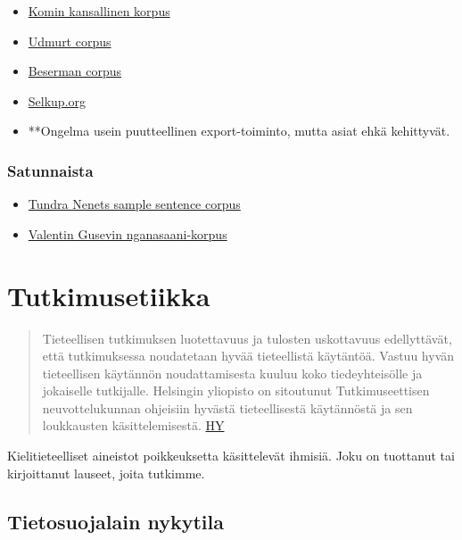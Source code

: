 \documentclass[]{book}
\providecommand{\tightlist}{%
  \setlength{\itemsep}{0pt}\setlength{\parskip}{0pt}}
\begin{document}
\begin{itemize}
\item
  \href{http://komicorpora.ru}{Komin kansallinen korpus}
\item
  \href{http://web-corpora.net/UdmurtCorpus/search/}{Udmurt corpus}
\item
  \href{http://beserman.ru/corpus/search/}{Beserman corpus}
\item
  \href{http://selkup.org/}{Selkup.org}
\item
  **Ongelma usein puutteellinen export-toiminto, mutta asiat ehkä
  kehittyvät.
\end{itemize}

\hypertarget{satunnaista}{%
\subsection{Satunnaista}\label{satunnaista}}

\begin{itemize}
\tightlist
\item
  \href{http://www.helsinki.fi/~tasalmin/tn_corpus.html}{Tundra Nenets
  sample sentence corpus}
\item
  \href{http://www.iling-ran.ru/gusev/Nganasan/}{Valentin Gusevin
  nganasaani-korpus}
\end{itemize}

\hypertarget{tutkimusetiikka-1}{%
\chapter{Tutkimusetiikka}\label{tutkimusetiikka-1}}

\begin{quote}
Tieteellisen tutkimuksen luotettavuus ja tulosten uskottavuus
edellyttävät, että tutkimuksessa noudatetaan hyvää tieteellistä
käytäntöä. Vastuu hyvän tieteellisen käytännön noudattamisesta kuuluu
koko tiedeyhteisölle ja jokaiselle tutkijalle. Helsingin yliopisto on
sitoutunut Tutkimuseettisen neuvottelukunnan ohjeisiin hyvästä
tieteellisestä käytännöstä ja sen loukkausten käsittelemisestä.
\href{https://www.helsinki.fi/fi/tutkimus/tutkimusymparisto/tutkimusetiikka}{HY}
\end{quote}

Kielitieteelliset aineistot poikkeuksetta käsittelevät ihmisiä. Joku on
tuottanut tai kirjoittanut lauseet, joita tutkimme.

\hypertarget{tietosuojalain-nykytila}{%
\section{Tietosuojalain nykytila}\label{tietosuojalain-nykytila}}
\end{document}
